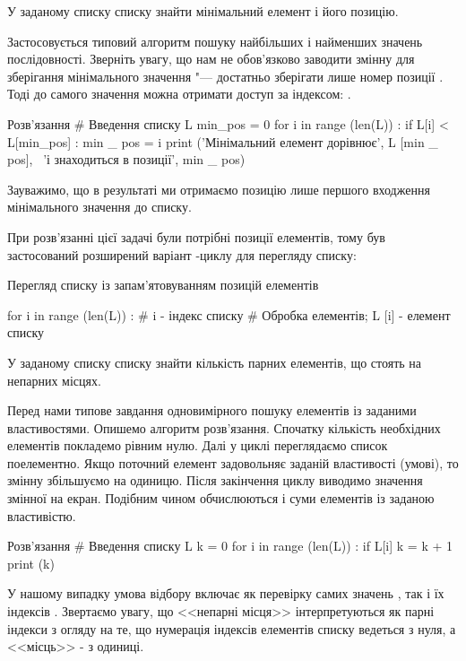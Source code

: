 \begin{pr}{}
У заданому списку списку знайти мінімальний елемент і його позицію.
\end{pr}

Застосовується типовий алгоритм пошуку найбільших і найменших значень послідовності. Зверніть увагу, що нам не обов'язково заводити змінну для зберігання мінімального значення "--- достатньо зберігати лише номер позиції . Тоді до самого значення можна отримати доступ за індексом: .

\begin{py}{Розв'язання}
# Введення списку L
min_pos = 0
for i in range (len(L)) :
    if L[i] < L[min_pos] :
        min _ pos = i
print ('Мінімальний елемент дорівнює', L [min _ pos], \
'і знаходиться в позиції', min _ pos)
\end{py}

Зауважимо, що в результаті ми отримаємо позицію лише першого входження мінімального значення до списку.

При розв'язанні цієї задачі були потрібні позиції елементів, тому був застосований розширений варіант -циклу для перегляду списку:
\begin{defn}{Перегляд списку із запам'ятовуванням позицій елементів}
\begin{py}{}
for i in range (len(L)) : # i - індекс списку
    # Обробка елементів; L [i] - елемент списку
\end{py}
\end{defn}

\begin{pr}{}
У заданому списку списку знайти кількість парних елементів, що стоять на непарних місцях.
\end{pr}

Перед нами типове завдання одновимірного пошуку елементів із заданими властивостями. Опишемо алгоритм розв'язання. Спочатку кількість  необхідних елементів покладемо рівним нулю. Далі у циклі переглядаємо список поелементно. Якщо поточний елемент задовольняє заданій властивості (умові), то змінну  збільшуємо на одиницю. Після закінчення циклу виводимо значення змінної  на екран. Подібним чином обчислюються і суми елементів із заданою властивістю.

\begin{py}{Розв'язання}
# Введення списку L
k = 0
for i in range (len(L)) :
    if L[i] %
        k = k + 1
print (k)
\end{py}
\noindent У нашому випадку умова відбору включає як перевірку самих значень , так і їх індексів \mi{[i]}. Звертаємо увагу, що <<непарні місця>> інтерпретуються як парні індекси з огляду на те, що нумерація індексів елементів списку ведеться з нуля, а <<місць>> - з одиниці.

